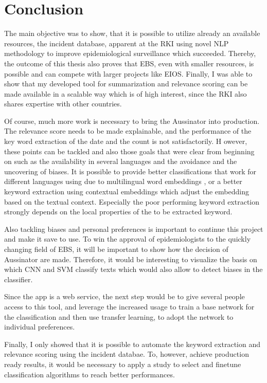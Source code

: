 \chapter{Conclusion}
The main objective was to show, that it is possible to utilize already an available resources, the incident database, apparent at the RKI using novel NLP methodology to improve epidemiological surveillance which succeeded. Thereby, the outcome of this thesis also proves that EBS, even with smaller resources, is possible and can compete with larger projects like EIOS. Finally, I was able to show that my developed tool for summarization and relevance scoring can be made available in a scalable way which is of high interest, since the RKI also shares expertise with other countries.

Of course, much more work is necessary to bring the Aussinator into production. The relevance score needs to be made explainable, and the performance of the key word extraction of the date and the count is not satisfactorily.
H
owever, these points can be tackled and also those goals that were clear from beginning on such as the availability in several languages and the avoidance and the uncovering of biases.
It is possible to provide better classifications that work for different languages using due to multilingual word embeddings \citep{Chen2018}, or a better keyword extraction using contextual embeddings \citep{Devlin2018, Peters2018} which adjust the embedding based on the textual context. Especially the poor performing keyword extraction strongly depends on the local properties of the to be extracted keyword.

Also tackling biases and personal preferences is important to continue this project and make it save to use.
To win the approval of epidemiologists to the quickly changing field of EBS, it will be important to show how the decision of Aussinator are made. Therefore, it would be interesting to visualize the basis on which CNN and SVM classify texts which would also allow to detect biases in the classifier.

Since the app is a web service, the next step would be to give several people access to this tool, and leverage the increased usage to train a base network for the classification and then use transfer learning, to adopt the network to individual preferences.

Finally, I only showed that it is possible to automate the keyword extraction and relevance scoring using the incident databae. To, however, achieve production ready results, it would be necessary to apply a study to select and finetune classification algorithms to reach better performances.
